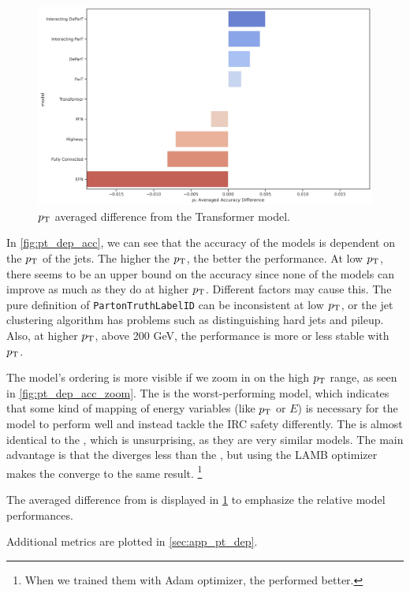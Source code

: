 \begin{figure}[htb]
    \centering
    \includegraphics[width=1\linewidth]{src/plots/results/pT_dep/relative_error.jpg}
    \caption{$p_\text{T}$ averaged difference from the Transformer model.}
    \label{fig:pt_dep_diff}
\end{figure}
In \cref{fig:pt_dep_acc}, we can see that the accuracy of the models is dependent on the $p_\text{T}$ of the jets.
The higher the $p_\text{T}$, the better the performance.
At low $p_\text{T}$, there seems to be an upper bound on the accuracy since none of the models can improve as much as they do at higher $p_\text{T}$.
Different factors may cause this.
The pure definition of \texttt{PartonTruthLabelID} can be inconsistent at low $p_\text{T}$, or the jet clustering algorithm has problems such as distinguishing hard jets and pileup.
Also, at higher $p_\text{T}$, above 200 GeV, the performance is more or less stable with $p_\text{T}$.

The model's ordering is more visible if we zoom in on the high $p_\text{T}$ range, as seen in \cref{fig:pt_dep_acc_zoom}.
The \EFN is the worst-performing model, which indicates that some kind of mapping of energy variables (like $p_\text{T}$ or $E$) is necessary for the model to perform well and instead tackle the IRC safety differently.
The \highway is almost identical to the \fc, which is unsurprising, as they are very similar models.
The main advantage is that the \highway diverges less than the \fc, but using the LAMB optimizer makes the \fc converge to the same result. \footnote{When we trained them with Adam optimizer, the \highway performed better.}

The averaged difference from \trans is displayed in \cref{fig:pt_dep_diff} to emphasize the relative model performances. 

Additional metrics are plotted in \cref{sec:app_pt_dep}.

